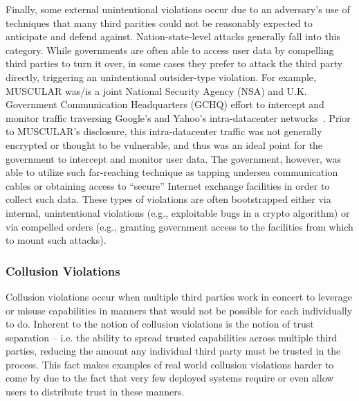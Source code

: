 Finally, some external unintentional violations occur due to an
adversary's use of techniques that many third parities could not be
reasonably expected to anticipate and defend
against. Nation-state-level attacks generally fall into this
category. While governments are often able to access user data by
compelling third parties to turn it over, in some cases they prefer to
attack the third party directly, triggering an unintentional
outsider-type violation. For example, MUSCULAR was/is a joint National
Security Agency (NSA) and U.K. Government Communication Headquarters
(GCHQ) effort to intercept and monitor traffic traversing Google's and
Yahoo's intra-datacenter networks~\cite{gellman-muscular}. Prior to
MUSCULAR's disclosure, this intra-datacenter traffic was not generally
encrypted or thought to be vulnerable, and thus was an ideal point for
the government to intercept and monitor user data. The government,
however, was able to utilize such far-reaching technique as tapping
undersea communication cables or obtaining access to ``secure''
Internet exchange facilities in order to collect such data. These
types of violations are often bootstrapped either via internal,
unintentional violations (e.g., exploitable bugs in a crypto
algorithm) or via compelled orders (e.g., granting government access
to the facilities from which to mount such attacks).

\subsubsection{Collusion Violations}

Collusion violations occur when multiple third parties work in concert
to leverage or misuse capabilities in manners that would not be
possible for each individually to do. Inherent to the notion of
collusion violations is the notion of trust separation -- i.e. the
ability to spread trusted capabilities across multiple third parties,
reducing the amount any individual third party must be trusted in the
process. This fact makes examples of real world collusion violations
harder to come by due to the fact that very few deployed systems
require or even allow users to distribute trust in these manners.

